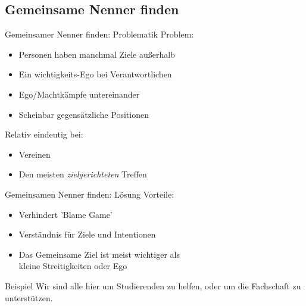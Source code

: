 \subsection{Gemeinsame Nenner finden}
\begin{frame}[c]{Gemeinsamer Nenner finden: Problematik}
    \large
    Problem:
    \begin{itemize}[<+(1)->]
        \item Personen haben manchmal Ziele außerhalb
        \item Ein wichtigkeits-Ego bei Verantwortlichen
        \item Ego/Machtkämpfe untereinander
        \item Scheinbar gegensätzliche Positionen
    \end{itemize}
    \pause
    Relativ eindeutig bei:
    \begin{itemize}[<+(1)->]
        \item Vereinen
        \item Den meisten {\em zielgerichteten} Treffen
    \end{itemize}
\end{frame}

\begin{frame}[c]{Gemeinsamen Nenner finden: Lösung}
    \large
    Vorteile:
    \begin{itemize}[<+(1)->]
        \item Verhindert 'Blame Game'
        \item Verständnis für Ziele und Intentionen
        \item Das Gemeinsame Ziel ist meist wichtiger als \\kleine Streitigkeiten oder Ego
    \end{itemize}
    \vspace{1cm}

    \pause
    \begin{block}{Beispiel}
        Wir sind alle hier um Studierenden zu helfen, oder 
        um die Fachschaft zu unterstützen.
    \end{block}
\end{frame}

